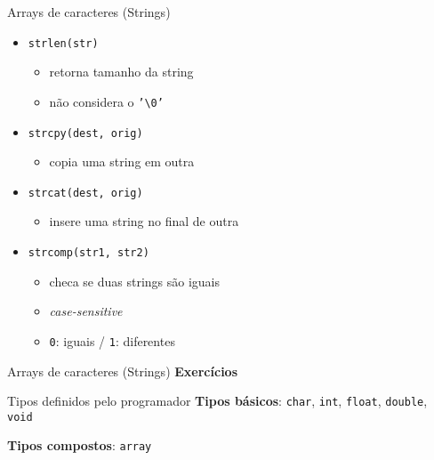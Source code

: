 \documentclass[10pt]{beamer}
\begin{document}
\begin{frame}[fragile]{Arrays de caracteres (Strings)}
    \Large
    \begin{itemize}
        \item \texttt{strlen(str)}
        
        \begin{itemize}
            \large
            \item retorna tamanho da string
            \item não considera o \texttt{'\textbackslash 0'}
        \end{itemize}

        \item \texttt{strcpy(dest, orig)}
        
        \begin{itemize}
            \large
            \item copia uma string em outra \faExclamationTriangle
        \end{itemize}

        \item \texttt{strcat(dest, orig)}
        
        \begin{itemize}
            \large
            \item insere uma string no final de outra \faExclamationTriangle
        \end{itemize}

        \item \texttt{strcomp(str1, str2)}
        
        \begin{itemize}
            \large
            \item checa se duas strings são iguais
            \item \textit{case-sensitive}
            \item \texttt{0}: iguais / \texttt{1}: diferentes
        \end{itemize}
    \end{itemize}
\end{frame}

\begin{frame}{Arrays de caracteres (Strings)}
    \huge \textbf{Exercícios}
\end{frame}

\begin{frame}{Tipos definidos pelo programador}
    \huge
    \textbf{Tipos básicos}: \texttt{char}, \texttt{int}, \texttt{float}, \texttt{double}, \texttt{void}

    \bigskip

    \textbf{Tipos compostos}: \texttt{array}
\end{frame}
\end{document}
